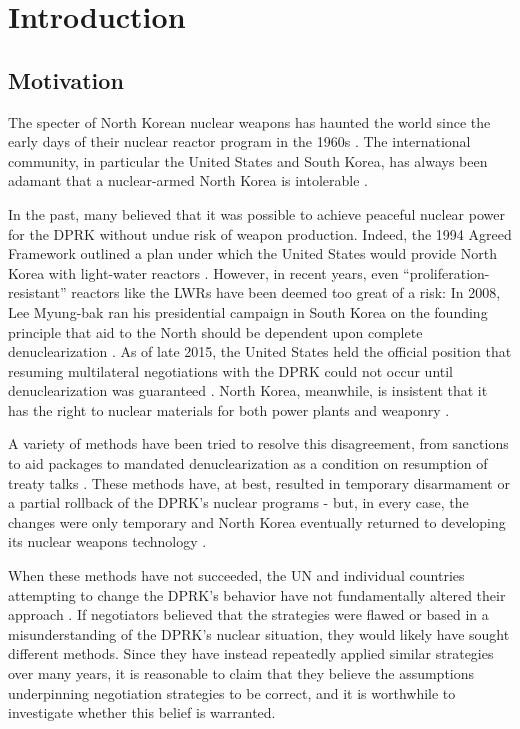 \chapter*{Introduction}

\section*{Motivation}

The specter of North Korean nuclear weapons has haunted the world since the early days of their nuclear reactor program in the 1960s \cite{pincus}. The international community, in particular the United States and South Korea, has always been adamant that a nuclear-armed North Korea is intolerable \cite{kerry,parksk}.

In the past, many believed that it was possible to achieve peaceful nuclear power for the DPRK without undue risk of weapon production. Indeed, the 1994 Agreed Framework outlined a plan under which the United States would provide North Korea with light-water reactors \cite{agreed}. However, in recent years, even ``proliferation-resistant'' reactors like the LWRs have been deemed too great of a risk: In 2008, Lee Myung-bak ran his presidential campaign in South Korea on the founding principle that aid to the North should be dependent upon complete denuclearization \cite{snyder}. As of late 2015, the United States held the official position that resuming multilateral negotiations with the DPRK could not occur until denuclearization was guaranteed \cite{pennington}. North Korea, meanwhile, is insistent that it has the right to nuclear materials for both power plants and weaponry \cite{kcna}. 

A variety of methods have been tried to resolve this disagreement, from sanctions to aid packages to mandated denuclearization as a condition on resumption of treaty talks \cite{bajoria,davenport}. These methods have, at best, resulted in temporary disarmament or a partial rollback of the DPRK's nuclear programs - but, in every case, the changes were only temporary and North Korea eventually returned to developing its nuclear weapons technology \cite{davenport,nti15,iaea09}.

When these methods have not succeeded, the UN and individual countries attempting to change the DPRK's behavior have not fundamentally altered their approach \cite{davenport,nti15}. If negotiators believed that the strategies were flawed or based in a misunderstanding of the DPRK's nuclear situation, they would likely have sought different methods. Since they have instead repeatedly applied similar strategies over many years, it is reasonable to claim that they believe the assumptions underpinning negotiation strategies to be correct, and it is worthwhile to investigate whether this belief is warranted.

